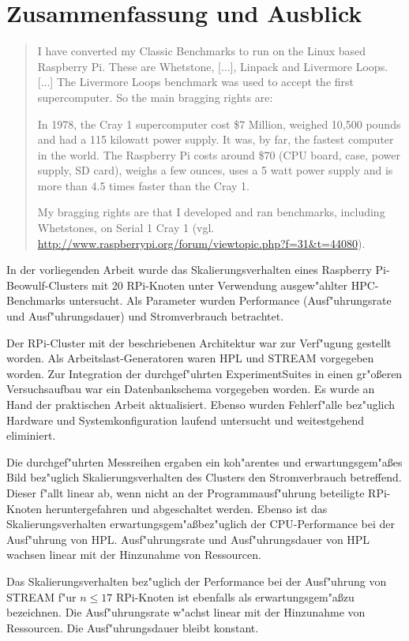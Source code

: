 \chapter{Zusammenfassung und Ausblick}\label{Kap5}
\begin{quote}
\onehalfspacing
I have converted my Classic Benchmarks to run on the Linux based Raspberry Pi. These are Whetstone, [...], Linpack and Livermore Loops. [...] The Livermore Loops benchmark was used to accept the first supercomputer. So the main bragging rights are:

In 1978, the Cray 1 supercomputer cost \$7 Million, weighed 10,500 pounds and had a 115 kilowatt power supply. It was, by far, the fastest computer in the world. The Raspberry Pi costs around \$70 (CPU board, case, power supply, SD card), weighs a few ounces, uses a 5 watt power supply and is more than 4.5 times faster than the Cray 1. 

My bragging rights are that I developed and ran benchmarks, including Whetstones, on Serial 1 Cray 1 (vgl. \url{http://www.raspberrypi.org/forum/viewtopic.php?f=31&t=44080}).
\end{quote}
In der vorliegenden Arbeit wurde das Skalierungsverhalten eines Raspberry Pi-Beowulf-Clusters mit 20 RPi-Knoten unter Verwendung ausgew"ahlter HPC-Benchmarks untersucht. Als Parameter wurden Performance (Ausf"uhrungsrate und Ausf"uhrungsdauer) und Stromverbrauch betrachtet. 

Der RPi-Cluster mit der beschriebenen Architektur war zur Verf"ugung gestellt worden. Als Arbeitslast-Generatoren waren HPL und STREAM vorgegeben worden. Zur Integration der durchgef"uhrten ExperimentSuites in einen gr"o\ss eren Versuchsaufbau war ein Datenbankschema vorgegeben worden. Es wurde an Hand der praktischen Arbeit aktualisiert. Ebenso wurden Fehlerf"alle bez"uglich Hardware und Systemkonfiguration laufend untersucht und weitestgehend eliminiert. 

Die durchgef"uhrten Messreihen ergaben ein koh"arentes und erwartungsgem"a\ss es Bild bez"uglich Skalierungsverhalten des Clusters den Stromverbrauch betreffend. Dieser f"allt linear ab, wenn nicht an der Programmausf"uhrung beteiligte RPi-Knoten heruntergefahren und abgeschaltet werden. Ebenso ist das Skalierungsverhalten erwartungsgem"a\ss bez"uglich der CPU-Performance bei der Ausf"uhrung von HPL. Ausf"uhrungsrate und Ausf"uhrungsdauer von HPL wachsen linear mit der Hinzunahme von Ressourcen. 

Das Skalierungsverhalten bez"uglich der Performance bei der Ausf"uhrung von STREAM f"ur $n\leq 17$ RPi-Knoten ist ebenfalls als erwartungsgem"a\ss zu bezeichnen. Die Ausf"uhrungsrate w"achst linear mit der Hinzunahme von Ressourcen. Die Ausf"uhrungsdauer bleibt konstant. 

